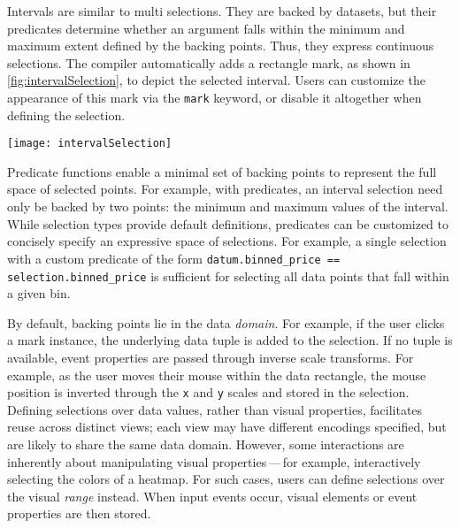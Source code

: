 Intervals are similar to multi selections. They are backed by datasets, but
their predicates determine whether an argument falls within the minimum and
maximum extent defined by the backing points. Thus, they express continuous
selections. The compiler automatically adds a rectangle mark, as shown in
\cref{fig:intervalSelection}, to depict the selected interval. Users can
customize the appearance of this mark via the \texttt{mark} keyword, or disable
it altogether when defining the selection.

\begin{figure*}[h!]
  \centering
  \texttt{[image: intervalSelection]}
  \caption{Highlight a continuous range of points using an \emph{interval}
  selection. A rectangle mark is automatically added to depict the interval
  extents.}
  \label{fig:intervalSelection}
\end{figure*}

Predicate functions enable a minimal set of backing points to represent the full
space of selected points. For example, with predicates, an interval selection
need only be backed by two points: the minimum and maximum values of the
interval. While selection types provide default definitions, predicates can be
customized to concisely specify an expressive space of selections. For example,
a single selection with a custom predicate of the form
\texttt{datum.binned\_price == selection.binned\_price} is sufficient for
selecting all data points that fall within a given bin.

By default, backing points lie in the data \emph{domain}. For example, if the
user clicks a mark instance, the underlying data tuple is added to the
selection. If no tuple is available, event properties are passed through inverse
scale transforms. For example, as the user moves their mouse within the data
rectangle, the mouse position is inverted through the \texttt{x} and \texttt{y}
scales and stored in the selection. Defining selections over data values, rather
than visual properties, facilitates reuse across distinct views; each view may
have different encodings specified, but are likely to share the same data
domain. However, some interactions are inherently about manipulating visual
properties\,---\,for example, interactively selecting the colors of a heatmap.
For such cases, users can define selections over the visual \emph{range}
instead. When input events occur, visual elements or event properties are then
stored.

